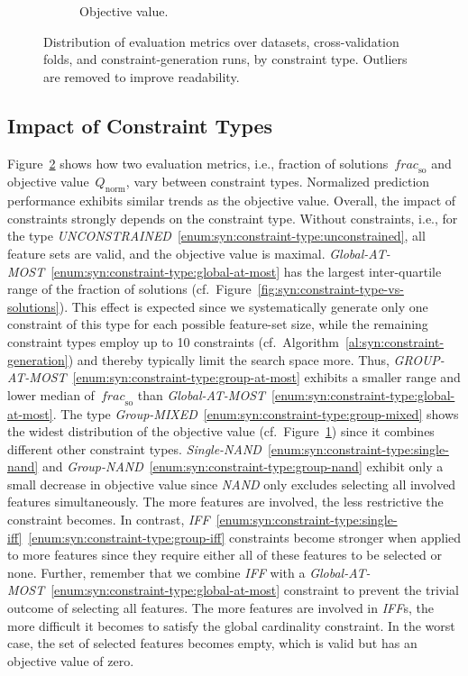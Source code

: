 \begin{figure}[t]
\begin{subfigure}{0.48\textwidth}
		\caption{Objective value.}
		\label{fig:syn:constraint-type-vs-objective}
	\end{subfigure}
	\caption{
		Distribution of evaluation metrics over datasets, cross-validation folds, and constraint-generation runs, by constraint type.
		Outliers are removed to improve readability.
	}
	\label{fig:syn:constraint-type}
\end{figure}

\subsection{Impact of Constraint Types}
\label{sec:syn:evaluation:constraint-types}

Figure~\ref{fig:syn:constraint-type} shows how two evaluation metrics, i.e., fraction of solutions~$\mathit{frac}_{\text{so}}$ and objective value~$Q_{\text{norm}}$, vary between constraint types.
Normalized prediction performance exhibits similar trends as the objective value.
Overall, the impact of constraints strongly depends on the constraint type.
Without constraints, i.e., for the type \emph{UNCONSTRAINED}~\ref{enum:syn:constraint-type:unconstrained}, all feature sets are valid, and the objective value is maximal.
\emph{Global-AT-MOST}~\ref{enum:syn:constraint-type:global-at-most} has the largest inter-quartile range of the fraction of solutions (cf.~Figure~\ref{fig:syn:constraint-type-vs-solutions}).
This effect is expected since we systematically generate only one constraint of this type for each possible feature-set size, while the remaining constraint types employ up to 10 constraints (cf.~Algorithm~\ref{al:syn:constraint-generation}) and thereby typically limit the search space more.
Thus, \emph{GROUP-AT-MOST}~\ref{enum:syn:constraint-type:group-at-most} exhibits a smaller range and lower median of~$\mathit{frac}_{\text{so}}$ than \emph{Global-AT-MOST}~\ref{enum:syn:constraint-type:global-at-most}.
The type \emph{Group-MIXED}~\ref{enum:syn:constraint-type:group-mixed} shows the widest distribution of the objective value (cf.~Figure~\ref{fig:syn:constraint-type-vs-objective}) since it combines different other constraint types.
\emph{Single-NAND}~\ref{enum:syn:constraint-type:single-nand} and \emph{Group-NAND}~\ref{enum:syn:constraint-type:group-nand} exhibit only a small decrease in objective value since \emph{NAND} only excludes selecting all involved features simultaneously.
The more features are involved, the less restrictive the constraint becomes.
In contrast, \emph{IFF}~\ref{enum:syn:constraint-type:single-iff}~\ref{enum:syn:constraint-type:group-iff} constraints become stronger when applied to more features since they require either all of these features to be selected or none.
Further, remember that we combine \emph{IFF} with a \emph{Global-AT-MOST}~\ref{enum:syn:constraint-type:global-at-most} constraint to prevent the trivial outcome of selecting all features.
The more features are involved in \emph{IFF}s, the more difficult it becomes to satisfy the global cardinality constraint.
In the worst case, the set of selected features becomes empty, which is valid but has an objective value of zero.

